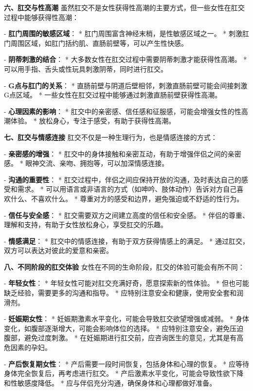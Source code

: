 \begin{enumerate}
  \textbf{六、肛交与性高潮}
  虽然肛交不是女性获得性高潮的主要方式，但一些女性在肛交过程中能够获得性高潮：

  - \textbf{肛门周围的敏感区域}：
    * 肛门周围富含神经末梢，是性敏感区域之一。
    * 刺激肛门周围区域，如肛门括约肌、直肠前壁等，可以产生性快感。

  - \textbf{阴蒂刺激的结合}：
    * 大多数女性在肛交过程中需要阴蒂刺激才能获得性高潮。
    * 可以用手指、舌头或性玩具刺激阴蒂，同时进行肛交。

  - \textbf{G点与肛门的关系}：
    * 直肠前壁与阴道后壁相邻，刺激直肠前壁可能会间接刺激G点区域。
    * 一些女性在肛交过程中能够通过刺激直肠前壁获得性高潮。

  - \textbf{心理因素的影响}：
    * 肛交中的亲密感、信任感和征服感，可能会增强女性的性高潮体验。
    * 放松身心，专注于感受，有助于获得性高潮。

  \textbf{七、肛交与情感连接}
  肛交不仅是一种生理行为，也是情感连接的方式：

  - \textbf{亲密感的增强}：
    * 肛交中的身体接触和亲密互动，有助于增强伴侣之间的亲密感。
    * 眼神交流、亲吻、拥抱等，可以加深情感连接。

  - \textbf{沟通的重要性}：
    * 肛交过程中，伴侣之间应保持开放的沟通，及时表达自己的感受和需求。
    * 可以用语言或非语言的方式（如呻吟、肢体动作）告诉对方自己喜欢什么、不喜欢什么。
    * 尊重对方的感受和边界，避免强迫或不舒适的性行为。

  - \textbf{信任与安全感}：
    * 肛交需要双方之间建立高度的信任和安全感。
    * 伴侣的尊重、理解和支持，有助于女性放松身心，享受肛交的乐趣。

  - \textbf{情感满足}：
    * 肛交中的情感连接，有助于双方获得情感上的满足。
    * 通过肛交，双方可以表达对彼此的爱意和亲密。

  \textbf{八、不同阶段的肛交体验}
  女性在不同的生命阶段，肛交的体验可能会有所不同：

  - \textbf{年轻女性}：
    * 年轻女性可能对肛交充满好奇，愿意探索新的性体验。
    * 但也可能缺乏经验，需要更多的沟通和指导。
    * 应特别注意安全和健康，使用安全套和润滑剂。

  - \textbf{妊娠期女性}：
    * 妊娠期激素水平变化，可能会导致肛交欲望增强或减弱。
    * 身体变化，如腹部逐渐增大，可能会影响体位的选择。
    * 应特别注意安全，避免压迫腹部，避免过度刺激。
    * 在妊娠期进行肛交前，应咨询医生的意见，尤其是有高危因素的孕妇。

  - \textbf{产后恢复期女性}：
    * 产后需要一段时间恢复，包括身体和心理的恢复。
    * 应等待身体完全恢复后，再考虑进行肛交。
    * 产后激素水平变化，可能会导致性欲下降和性敏感度降低。
    * 应与伴侣充分沟通，确保身体和心理都做好准备。


\end{enumerate}
